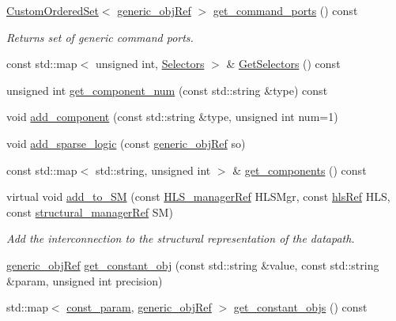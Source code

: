 \begin{DoxyCompactItemize}
\hyperlink{classCustomOrderedSet}{Custom\+Ordered\+Set}$<$ \hyperlink{generic__obj_8hpp_acb533b2ef8e0fe72e09a04d20904ca81}{generic\+\_\+obj\+Ref} $>$ \hyperlink{classconn__binding_a1f0458cf4aaf63d2786931ad13d1ae71}{get\+\_\+command\+\_\+ports} () const
\begin{DoxyCompactList}\small\item\em Returns set of generic command ports. \end{DoxyCompactList}\item 
const std\+::map$<$ unsigned int, \hyperlink{classconn__binding_a1994d72baf506bcb1d94e0cfede4258b}{Selectors} $>$ \& \hyperlink{classconn__binding_acc27af44bcec7ebad475db78c098ce59}{Get\+Selectors} () const
\item 
unsigned int \hyperlink{classconn__binding_ae44e000813aa8342a78b2dee1009c66b}{get\+\_\+component\+\_\+num} (const std\+::string \&type) const
\item 
void \hyperlink{classconn__binding_a0d6764ed3f41fa21e131a4a5c3a84978}{add\+\_\+component} (const std\+::string \&type, unsigned int num=1)
\item 
void \hyperlink{classconn__binding_ab42e47f8c1b558caf9029baed9c59705}{add\+\_\+sparse\+\_\+logic} (const \hyperlink{generic__obj_8hpp_acb533b2ef8e0fe72e09a04d20904ca81}{generic\+\_\+obj\+Ref} so)
\item 
const std\+::map$<$ std\+::string, unsigned int $>$ \& \hyperlink{classconn__binding_a26e9ce42b031e5b5051a6e4aad81c0bd}{get\+\_\+components} () const
\item 
virtual void \hyperlink{classconn__binding_aaf898285e246aa69fd49c271cfb8b0bc}{add\+\_\+to\+\_\+\+SM} (const \hyperlink{hls__manager_8hpp_acd3842b8589fe52c08fc0b2fcc813bfe}{H\+L\+S\+\_\+manager\+Ref} H\+L\+S\+Mgr, const \hyperlink{hls_8hpp_a75d0c73923d0ddfa28c4843a802c73a7}{hls\+Ref} H\+LS, const \hyperlink{structural__manager_8hpp_ab3136f0e785d8535f8d252a7b53db5b5}{structural\+\_\+manager\+Ref} SM)
\begin{DoxyCompactList}\small\item\em Add the interconnection to the structural representation of the datapath. \end{DoxyCompactList}\item 
\hyperlink{generic__obj_8hpp_acb533b2ef8e0fe72e09a04d20904ca81}{generic\+\_\+obj\+Ref} \hyperlink{classconn__binding_ae385543cd719612dd44a8a54b3df8ad8}{get\+\_\+constant\+\_\+obj} (const std\+::string \&value, const std\+::string \&param, unsigned int precision)
\item 
std\+::map$<$ \hyperlink{classconn__binding_a08cb5241cd588e215f61ab30d27a14c0}{const\+\_\+param}, \hyperlink{generic__obj_8hpp_acb533b2ef8e0fe72e09a04d20904ca81}{generic\+\_\+obj\+Ref} $>$ \hyperlink{classconn__binding_a46ef802caccfc0f0fb9625b0ba99e5eb}{get\+\_\+constant\+\_\+objs} () const
\end{DoxyCompactItemize}
